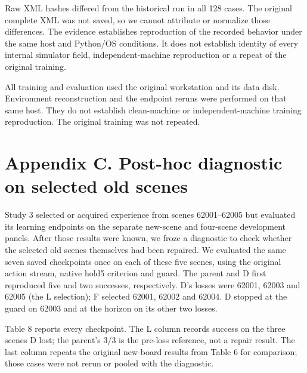 \documentclass[10pt,letterpaper]{article}
\begin{document}
Raw XML hashes differed from the historical run in all 128 cases. The
original complete XML was not saved, so we cannot attribute or normalize
those differences. The evidence establishes reproduction of the recorded
behavior under the same host and Python/OS conditions. It does not
establish identity of every internal simulator field,
independent-machine reproduction or a repeat of the original training.

All training and evaluation used the original workstation and its data
disk. Environment reconstruction and the endpoint reruns were performed
on that same host. They do not establish clean-machine or
independent-machine training reproduction. The original training was not
repeated.

\section*{Appendix C. Post-hoc diagnostic on selected old
scenes}\label{appendix-c.-post-hoc-diagnostic-on-selected-old-scenes}

Study 3 selected or acquired experience from scenes 62001--62005 but
evaluated its learning endpoints on the separate new-scene and
four-scene development panels. After those results were known, we froze
a diagnostic to check whether the selected old scenes themselves had
been repaired. We evaluated the same seven saved checkpoints once on
each of these five scenes, using the original action stream, native
hold5 criterion and guard. The parent and D first reproduced five and
two successes, respectively. D's losses were 62001, 62003 and 62005 (the
L selection); F selected 62001, 62002 and 62004. D stopped at the guard
on 62003 and at the horizon on its other two losses.

Table 8 reports every checkpoint. The L column records success on the
three scenes D lost; the parent's 3/3 is the pre-loss reference, not a
repair result. The last column repeats the original new-board results
from Table 6 for comparison; those cases were not rerun or pooled with
the diagnostic.
\end{document}
